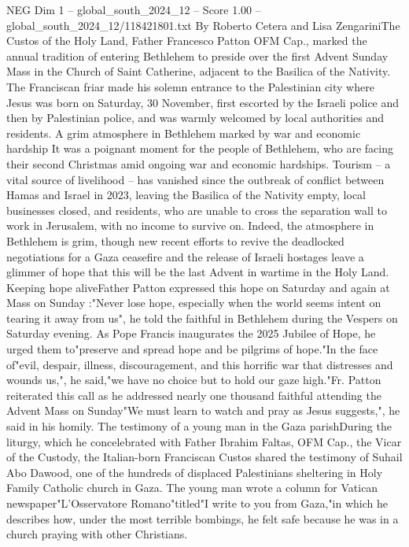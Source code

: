 \begin{textsample}{NEG Dim 1 – global\_south\_2024\_12 – Score 1.00 – global\_south\_2024\_12/118421801.txt}  \label{ex:f1_neg_262}
By Roberto Cetera and Lisa ZengariniThe Custos of the Holy Land, Father Francesco Patton OFM Cap., marked the annual tradition of entering Bethlehem to preside over the first Advent Sunday Mass in the Church of Saint Catherine, adjacent to the Basilica of the Nativity.
The Franciscan friar made his solemn entrance to the Palestinian city where Jesus was born on Saturday, 30 November, first escorted by the Israeli police and then by Palestinian police, and was warmly welcomed by local authorities and residents.
A grim atmosphere in Bethlehem marked by war and economic hardship It was a poignant moment for the people of Bethlehem, who are facing their second Christmas amid ongoing war and economic hardships.
Tourism -- a vital source of livelihood -- has vanished since the outbreak of conflict between Hamas and Israel in 2023, leaving the Basilica of the Nativity empty, local businesses closed, and residents, who are unable to cross the separation wall to work in Jerusalem, with no income to survive on.
Indeed, the atmosphere in Bethlehem is grim, though new recent efforts to revive the deadlocked negotiations for a Gaza ceasefire and the release of Israeli hostages leave a glimmer of hope that this will be the last Advent in wartime in the Holy Land.
Keeping hope aliveFather Patton expressed this hope on Saturday and again at Mass on Sunday :"Never lose hope, especially when the world seems intent on tearing it away from us", he told the faithful in Bethlehem during the Vespers on Saturday evening.
As Pope Francis inaugurates the 2025 Jubilee of Hope, he urged them to"preserve and spread hope and be pilgrims of hope."In the face of"evil, despair, illness, discouragement, and this horrific war that distresses and wounds us,", he said,"we have no choice but to hold our gaze high."Fr.
Patton reiterated this call as he addressed nearly one thousand faithful attending the Advent Mass on Sunday"We must learn to watch and pray as Jesus suggests,", he said in his homily.
The testimony of a young man in the Gaza parishDuring the liturgy, which he concelebrated with Father Ibrahim Faltas, OFM Cap., the Vicar of the Custody, the Italian-born Franciscan Custos shared the testimony of Suhail Abo Dawood, one of the hundreds of displaced Palestinians sheltering in Holy Family Catholic church in Gaza.
The young man wrote a column for Vatican newspaper"L'Osservatore Romano"titled"I write to you from Gaza,"in which he describes how, under the most terrible bombings, he felt safe because he was in a church praying with other Christians.

\end{textsample}
